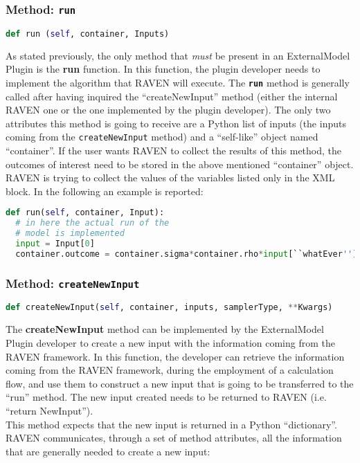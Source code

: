 \subsubsection{Method: \texttt{run}}
\label{subsubsec:runExternalModelPlugin}
\begin{lstlisting}[language=python]
def run (self, container, Inputs)
\end{lstlisting}
As stated previously, the only method that \emph{must} be present in an
ExternalModel Plugin is the \textbf{run} function.
%
In this function, the plugin developer needs to implement the algorithm that RAVEN will
execute.
%
The \texttt{\textbf{run}} method is generally called after having inquired the
``createNewInput'' method (either the internal RAVEN one or the one implemented by
the plugin developer).
%
The only two attributes this method is going to receive are a Python list of inputs
(the inputs coming from the \texttt{createNewInput} method) and a ``self-like'' object
named ``container''.
%
If the user wants RAVEN to collect the results of this method, the outcomes of
interest need to be stored in the above mentioned ``container'' object.
%
\nb RAVEN is trying to collect the values of the variables listed only in the
 XML block.
%
In the following an example is reported:
\begin{lstlisting}[language=python, basicstyle=\scriptsize\ttfamily, breaklines=True, columns=fullflexible]
def run(self, container, Input):
  # in here the actual run of the
  # model is implemented
  input = Input[0]
  container.outcome = container.sigma*container.rho*input[``whatEver'']
\end{lstlisting}

\subsubsection{Method: \texttt{createNewInput}}
\label{subsubsec:createNewInputExternalModelPlugin}
\begin{lstlisting}[language=python]
def createNewInput(self, container, inputs, samplerType, **Kwargs)
\end{lstlisting}

The \textbf{createNewInput} method can be implemented by the ExternalModel Plugin
developer to create a new input with the information coming from the RAVEN framework.
%
In this function, the developer can retrieve the information coming from the RAVEN
framework, during the employment of a calculation flow, and use them to
construct a new input that is going to be transferred to the ``run'' method.
%
The new input created needs to be returned to RAVEN (i.e. ``return NewInput'').
\\This method expects that the new input is returned in a Python ``dictionary''.
%
RAVEN communicates, through a set of method attributes, all the information
that are generally needed to create a new input:

